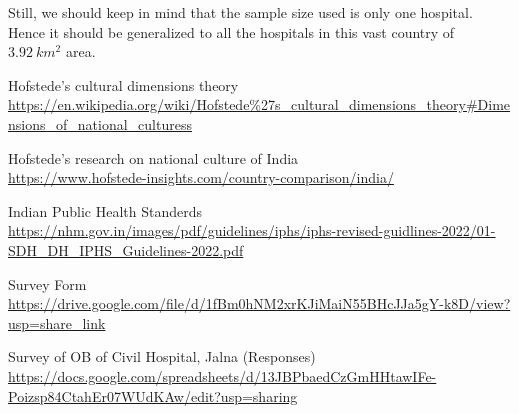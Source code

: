 \documentclass[12pt]{article}
\begin{document}
Still, we should keep in mind that the sample size used is only one hospital. Hence it should be generalized to all the hospitals in this vast country of $3.92\ km^2$ area.

\newpage
\begin{thebibliography}{99}

    {Hofstede's cultural dimensions theory\\
    \url{https://en.wikipedia.org/wiki/Hofstede%27s_cultural_dimensions_theory#Dimensions_of_national_culturess}}


    {Hofstede's research on national culture of India\\
    \url{https://www.hofstede-insights.com/country-comparison/india/}}

    {Indian Public Health Standerds\\
    \url{https://nhm.gov.in/images/pdf/guidelines/iphs/iphs-revised-guidlines-2022/01-SDH_DH_IPHS_Guidelines-2022.pdf}}

    {Survey Form\\
    \url{https://drive.google.com/file/d/1fBm0hNM2xrKJiMaiN55BHcJJa5gY-k8D/view?usp=share_link}}

    {Survey of OB of Civil Hospital, Jalna (Responses)\\
    \url{https://docs.google.com/spreadsheets/d/13JBPbaedCzGmHHtawIFe-Poizsp84CtahEr07WUdKAw/edit?usp=sharing}}

\end{thebibliography}
\end{document}

